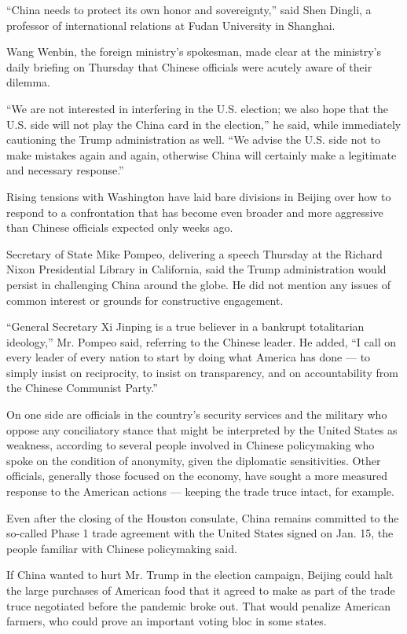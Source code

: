 ``China needs to protect its own honor and sovereignty,'' said Shen
Dingli, a professor of international relations at Fudan University in
Shanghai.

Wang Wenbin, the foreign ministry's spokesman, made clear at the
ministry's daily briefing on Thursday that Chinese officials were
acutely aware of their dilemma.

``We are not interested in interfering in the U.S. election; we also
hope that the U.S. side will not play the China card in the election,''
he said, while immediately cautioning the Trump administration as well.
``We advise the U.S. side not to make mistakes again and again,
otherwise China will certainly make a legitimate and necessary
response.''

Rising tensions with Washington have laid bare divisions in Beijing over
how to respond to a confrontation that has become even broader and more
aggressive than Chinese officials expected only weeks ago.

Secretary of State Mike Pompeo, delivering a speech Thursday at the
Richard Nixon Presidential Library in California, said the Trump
administration would persist in challenging China around the globe. He
did not mention any issues of common interest or grounds for
constructive engagement.

``General Secretary Xi Jinping is a true believer in a bankrupt
totalitarian ideology,'' Mr. Pompeo said, referring to the Chinese
leader. He added, ``I call on every leader of every nation to start by
doing what America has done --- to simply insist on reciprocity, to
insist on transparency, and on accountability from the Chinese Communist
Party.''

On one side are officials in the country's security services and the
military who oppose any conciliatory stance that might be interpreted by
the United States as weakness, according to several people involved in
Chinese policymaking who spoke on the condition of anonymity, given the
diplomatic sensitivities. Other officials, generally those focused on
the economy, have sought a more measured response to the American
actions --- keeping the trade truce intact, for example.

Even after the closing of the Houston consulate, China remains committed
to the so-called Phase 1 trade agreement with the United States signed
on Jan. 15, the people familiar with Chinese policymaking said.

If China wanted to hurt Mr. Trump in the election campaign, Beijing
could halt the large purchases of American food that it agreed to make
as part of the trade truce negotiated before the pandemic broke out.
That would penalize American farmers, who could prove an important
voting bloc in some states.

